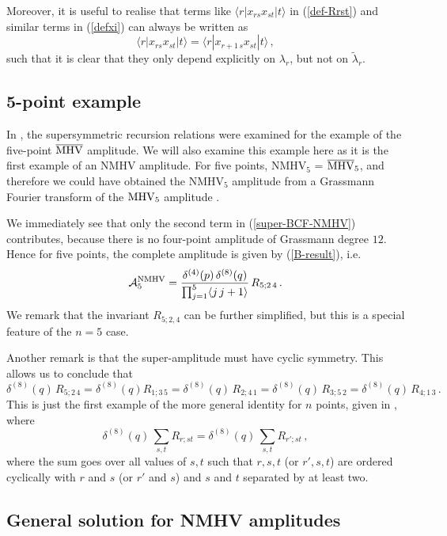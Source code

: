 \documentclass[12pt]{article}
\def \be  {\begin{equation}}
\def \ee  {\end{equation}}
\newcommand \widebar [1] {\overline{#1}}
\def\l<{\langle}\def\r>{\rangle}
\def\bMHV{\overline{\rm MHV}}
\begin{document}
Moreover, it is useful to realise that terms like $\l<r|x_{rs}x_{st}|t\r>$ in (\ref{def-Rrst}) and similar terms in (\ref{defxi}) can
always be written as
\be
\label{shift-aux}
\l<r|x_{rs}x_{st}|t\r> = \l<r|x_{r+1\,s}x_{st}|t\r>\,,
\ee
such that it is clear that they only depend explicitly on $\lambda_{r}$, but not on $\tilde{\lambda}_{r}$.

\subsection{5-point example}

In \cite{Brandhuber:2008pf}, the supersymmetric recursion relations were examined for the example of the five-point $\bMHV$ amplitude. We will also examine this example here as it is the first example of an NMHV amplitude.
For five points, NMHV${}_{5}$ = $\widebar{{\rm MHV}}_{5}$, and
therefore we could have obtained the NMHV${}_{5}$ amplitude from a
Grassmann Fourier transform of the ${\rm MHV}_{5}$ amplitude
\cite{dhks6}.

We immediately see that only the second term in
(\ref{super-BCF-NMHV}) contributes, because there is no four-point
amplitude of Grassmann degree $12$. Hence for five points, the
complete amplitude is given by (\ref{B-result}), i.e.
\be\label{NMHV5}
 {\cal A}^{\rm {NMHV}}_{5} = \frac{ \delta^{(4)}(p) \, \delta^{(8)}(q)}{\prod_{j=1}^{5} \langle j \, j+1 \rangle } \, R_{5;2\,4} \,.
\ee
We remark that the invariant $R_{5;2,4}$ can be further simplified, but this is a special feature of the $n=5$ case.

Another remark is that the super-amplitude must have cyclic
symmetry. This allows us to conclude that
\be \label{cyclic-5pt}
\delta^{(8)}(q)\, R_{5;2\,4}  = \delta^{(8)}(q)
R_{1;3\,5} = \delta^{(8)}(q)\, R_{2;4\,1} =
\delta^{(8)}(q)\, R_{3;5\,2} = \delta^{(8)}(q)\,
R_{4;1\,3}\,.
\ee
This is just the first
example of the more general identity for $n$ points, given in \cite{dhks6}, where
\be
\label{cyclic-npt} \delta^{(8)}(q)\, \sum_{s,t} R_{r;st} =
\delta^{(8)}(q)\, \sum_{s,t} R_{r';st}\,,
\ee
where the sum
goes over all values of $s,t$ such that $r,s,t$ (or $r',s,t$) are ordered cyclically with $r$ and $s$ (or $r'$ and $s$) and $s$ and $t$ separated by at least two.


\subsection{General solution for NMHV amplitudes}\label{NMHViteration}
\end{document}
